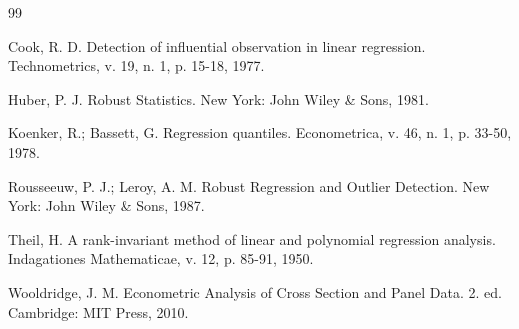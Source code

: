 \documentclass[12pt,a4paper]{article}
\begin{document}
\begin{thebibliography}{99}

 Cook, R. D. Detection of influential observation in linear regression. Technometrics, v. 19, n. 1, p. 15-18, 1977.

 Huber, P. J. Robust Statistics. New York: John Wiley \& Sons, 1981.

 Koenker, R.; Bassett, G. Regression quantiles. Econometrica, v. 46, n. 1, p. 33-50, 1978.

 Rousseeuw, P. J.; Leroy, A. M. Robust Regression and Outlier Detection. New York: John Wiley \& Sons, 1987.

 Theil, H. A rank-invariant method of linear and polynomial regression analysis. Indagationes Mathematicae, v. 12, p. 85-91, 1950.

 Wooldridge, J. M. Econometric Analysis of Cross Section and Panel Data. 2. ed. Cambridge: MIT Press, 2010.

\end{thebibliography}
\end{document}

